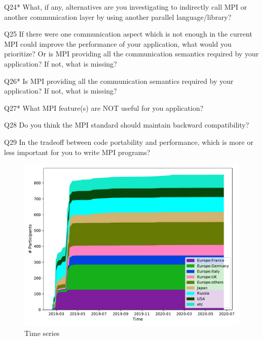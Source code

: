 \begin{description}
\item{Q24*} What, if any, alternatives are you investigating to indirectly call MPI or another communication layer by using another parallel language/library?
\item{Q25} If there were one communication aspect which is not enough in the current MPI could improve the performance of your application, what would you prioritize? Or is MPI providing all the communication semantics required by your application? If not, what is missing?
\item{Q26*} Is MPI providing all the communication semantics required by your application? If not, what is missing?
\item{Q27*} What MPI feature(s) are NOT useful for you application?
\item{Q28} Do you think the MPI standard should maintain backward compatibility?
\item{Q29} In the tradeoff between code portability and performance, which is more or less important for you to write MPI programs?
\end{description}



\begin{figure}[htb]
\begin{center}
\includegraphics[width=12cm]{../pdfs/TimeSeries.pdf}
\caption{Time series}
\label{fig:timeseries}
\end{center}
\end{figure}
